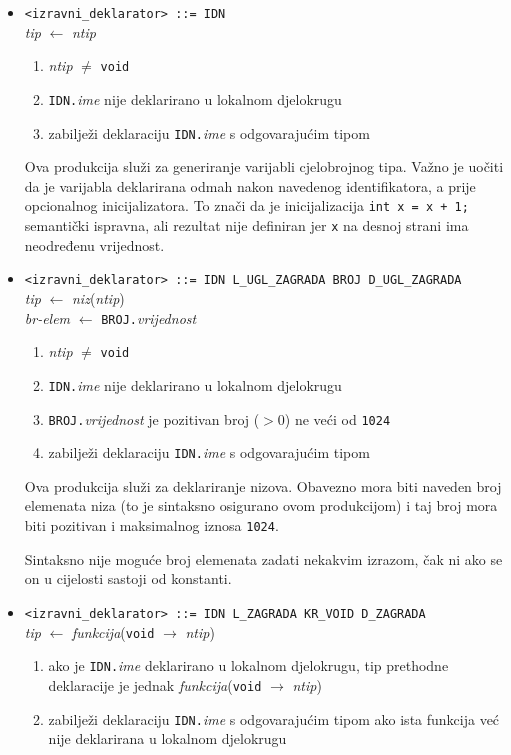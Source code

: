 \documentclass[times, 12pt, utf8]{book}
\begin{document}
\begin{itemize}

\item
\verb|<izravni_deklarator> ::= IDN|\\
\emph{tip} \(\leftarrow\) \emph{ntip}
\begin{enumerate}
\item
\emph{ntip} \(\neq\) \verb|void|
\item
\verb|IDN.|\emph{ime} nije deklarirano u lokalnom djelokrugu
\item
zabilježi deklaraciju \verb|IDN.|\emph{ime} s odgovarajućim tipom
\end{enumerate}

Ova produkcija služi za generiranje varijabli cjelobrojnog tipa.
Važno je uočiti da je varijabla deklarirana odmah nakon navedenog identifikatora, a prije opcionalnog inicijalizatora.
To znači da je inicijalizacija \verb|int x = x + 1;| semantički ispravna, ali rezultat nije definiran jer \verb|x| na desnoj strani ima neodređenu vrijednost.

\item
\verb|<izravni_deklarator> ::= IDN L_UGL_ZAGRADA BROJ D_UGL_ZAGRADA|\\
\emph{tip} \(\leftarrow\) \emph{niz}(\emph{ntip})\\
\emph{br-elem} \(\leftarrow\) \verb|BROJ.|\emph{vrijednost}
\begin{enumerate}
\item
\emph{ntip} \(\neq\) \verb|void|
\item
\verb|IDN.|\emph{ime} nije deklarirano u lokalnom djelokrugu
\item
\verb|BROJ.|\emph{vrijednost} je pozitivan broj (\(> 0\)) ne veći od \verb|1024|
\item
zabilježi deklaraciju \verb|IDN.|\emph{ime} s odgovarajućim tipom
\end{enumerate}

Ova produkcija služi za deklariranje nizova.
Obavezno mora biti naveden broj elemenata niza (to je sintaksno osigurano ovom produkcijom) i taj broj mora biti pozitivan i maksimalnog iznosa \verb|1024|.

Sintaksno nije moguće broj elemenata zadati nekakvim izrazom, čak ni ako se on u cijelosti sastoji od konstanti.

\item
\verb|<izravni_deklarator> ::= IDN L_ZAGRADA KR_VOID D_ZAGRADA|\\
\emph{tip} \(\leftarrow\) \emph{funkcija}(\verb|void| \(\to\) \emph{ntip})
\begin{enumerate}
\item
ako je \verb|IDN.|\emph{ime} deklarirano u lokalnom djelokrugu, tip prethodne deklaracije je jednak \emph{funkcija}(\verb|void| \(\to\) \emph{ntip})
\item
zabilježi deklaraciju \verb|IDN.|\emph{ime} s odgovarajućim tipom ako ista funkcija već nije deklarirana u lokalnom djelokrugu
\end{enumerate}


\end{itemize}
\end{document}
